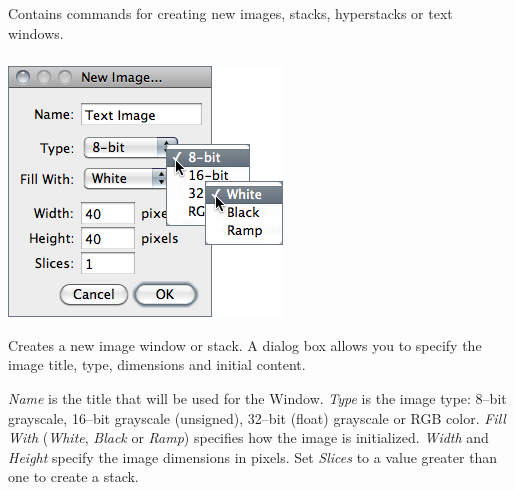 \section{\protect{}\label{sec:File}}


\subsection{\protect{}}

Contains commands for creating new images, stacks, hyperstacks or
text windows.




\subsubsection{\protect{}\label{sub:Image...[n]}}

\begin{minipage}[c][1\totalheight][t]{0.39\columnwidth}%
\includegraphics[scale=0.55]{images/New}%
\end{minipage}%
\begin{minipage}[c][1\totalheight][t]{0.61\columnwidth}%
Creates a new image window or stack. A dialog box allows you to specify
the image title, type, dimensions and initial content.\medskip{}


\emph{Name} is the title that will be used for the Window. \emph{Type}
is the image type: 8--bit grayscale, 16--bit grayscale (unsigned),
32--bit (float) grayscale or RGB color. \emph{Fill With} (\emph{White},
\emph{Black} or \emph{Ramp}) specifies how the image is initialized.
\emph{Width} and \emph{Height} specify the image dimensions in pixels.
Set \emph{Slices} to a value greater than one to create a stack.%
\end{minipage}



